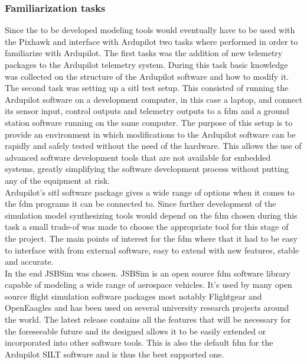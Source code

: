 \subsubsection{Familiarization tasks}
Since the to be developed modeling tools would eventually have to be used with the Pixhawk and interface with Ardupilot two tasks where performed in order to familiarize with Ardupilot. The first tasks was the addition of new telemetry packages to the Ardupilot telemetry system. During this task basic knowledge was collected on the structure of the Ardupilot software and how to modify it. \\

The second task was setting up a \gls{sitl} test setup. This consisted of running the Ardupilot software on a development computer, in this case a laptop, and connect its sensor input, control outputs and telemetry outputs to a \gls{fdm} and a ground station software running on the same computer. The purpose of this setup is to provide an environment in which modifications to the Ardupilot software can be rapidly and safely tested without the need of the hardware. This allows the use of advanced software development tools that are not available for embedded systems, greatly simplifying the software development process without putting any of the equipment at risk. \\

Ardupilot's \gls{sitl} software package gives a wide range of options when it comes to the \gls{fdm} programs it can be connected to. Since further development of the simulation model synthesizing tools would depend on the \gls{fdm} chosen during this task a small trade-of was made to choose the appropriate tool for this stage of the project. The main points of interest for the \gls{fdm} where that it had to be easy to interface with from external software, easy to extend with new features, stable and accurate. \\

In the end JSBSim was chosen. JSBSim is an open source \gls{fdm} software library capable of modeling a wide range of aerospace vehicles. It's used by many open source flight simulation software packages most notably Flightgear and OpenEaagles and has been used on several university research projects around the world. The latest release contains all the features that will be necessary for the foreseeable future and its designed allows it to be easily extended or incorporated into other software tools. This is also the default \gls{fdm} for the Ardupilot SILT software and is thus the best supported one.

